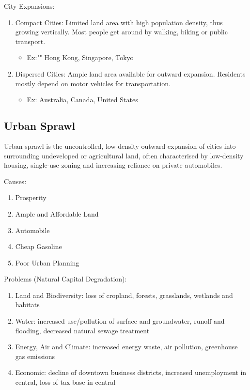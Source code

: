 \documentclass[12pt, a4paper]{article}
\begin{document}
\begin{multicols*}{3}
City Expansions:
\begin{enumerate}[\roman*.]
  \item Compact Cities: Limited land area with high population density, thus growing vertically. Most people get around by walking, biking or public transport.
    \begin{itemize}\vspace{2pt}
      \item Ex:"" Hong Kong, Singapore, Tokyo
    \end{itemize}
  \item Dispersed Cities: Ample land area available for outward expansion. Residents mostly depend on motor vehicles for transportation.
    \begin{itemize}\vspace{2pt}
      \item Ex: Australia, Canada, United States
    \end{itemize}
\end{enumerate}

\colbreak
\subsection{Urban Sprawl}
Urban sprawl is the uncontrolled, low-density outward expansion of cities into surrounding undeveloped or agricultural land, often characterised by low-density housing, single-use zoning and increasing reliance on private automobiles. 

Causes:
\begin{enumerate}[\roman*.]
  \item Prosperity
  \item Ample and Affordable Land
  \item Automobile 
  \item Cheap Gasoline 
  \item Poor Urban Planning
\end{enumerate}

Problems (Natural Capital Degradation):
\begin{enumerate}[\roman*.]
  \item Land and Biodiversity: loss of cropland, forests, grasslands, wetlands and habitats
  \item Water: increased use/pollution of surface and groundwater, runoff and flooding, decreased natural sewage treatment
  \item Energy, Air and Climate: increased energy waste, air pollution, greenhouse gas emissions 
  \item Economic: decline of downtown business districts, increased unemployment in central, loss of tax base in central
\end{enumerate}


\end{multicols*}
\end{document}
